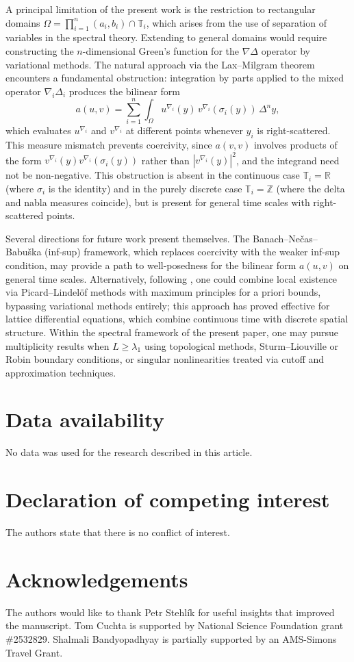 \documentclass{article}
\numberwithin{equation}{section}
\numberwithin{theorem}{section}
\begin{document}
A principal limitation of the present work is the restriction to rectangular domains $\Omega = \displaystyle\prod_{i=1}^n (a_i, b_i) \cap \mathbb{T}_i$, which arises from the use of separation of variables in the spectral theory. Extending to general domains would require constructing the $n$-dimensional Green's function for the $\nabla\Delta$ operator by variational methods. The natural approach via the Lax--Milgram theorem encounters a fundamental obstruction: integration by parts applied to the mixed operator $\nabla_i\Delta_i$ produces the bilinear form
\[a(u,v) = \sum_{i=1}^n \int_\Omega u^{\nabla_i}(y)\,v^{\nabla_i}(\sigma_i(y))\, \Delta^n y,\]
which evaluates $u^{\nabla_i}$ and $v^{\nabla_i}$ at different points whenever $y_i$ is right-scattered. This measure mismatch prevents coercivity, since $a(v,v)$ involves products of the form $v^{\nabla_i}(y)v^{\nabla_i}(\sigma_i(y))$ rather than $|v^{\nabla_i}(y)|^2$, and the integrand need not be non-negative. This obstruction is absent in the continuous case $\mathbb{T}_i = \mathbb{R}$ (where $\sigma_i$ is the identity) and in the purely discrete case $\mathbb{T}_i = \mathbb{Z}$ (where the delta and nabla measures coincide), but is present for general time scales with right-scattered points.

Several directions for future work present themselves. The Banach--Ne\v{c}as--Babu\v{s}ka (inf-sup) framework, which replaces coercivity with the weaker inf-sup condition, may provide a path to well-posedness for the bilinear form $a(u,v)$ on general time scales. Alternatively, following \cite{Stehlik-Volek-2015,Slavik-Stehlik-Volek-2019}, one could combine local existence via Picard--Lindel\"of methods with maximum principles for a priori bounds, bypassing variational methods entirely; this approach has proved effective for lattice differential equations, which combine continuous time with discrete spatial structure. Within the spectral framework of the present paper, one may pursue multiplicity results when $L \geq \lambda_1$ using topological methods, Sturm--Liouville or Robin boundary conditions, or singular nonlinearities treated via cutoff and approximation techniques.

\section*{Data availability}
No data was used for the research described in this article.

\section*{Declaration of competing interest}
The authors state that there is no conflict of interest.

\section*{Acknowledgements}
The authors would like to thank Petr Stehl\'{i}k for useful insights that improved the manuscript. Tom Cuchta is supported by National Science Foundation grant \#2532829. Shalmali Bandyopadhyay is partially supported by an AMS-Simons Travel Grant.


 
\end{document}
